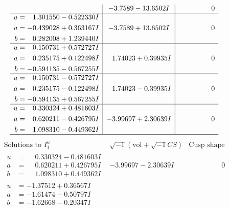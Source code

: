 \documentclass[1p]{elsarticle_modified}
\theoremstyle{definition}
\newcommand{\I}{\sqrt{-1}}
\begin{document}
$$\begin{array}{c|c|c}
 & -3.7589 - 13.6502 I & \phantom{-0.000000 } 0 \\ \hline\begin{aligned}
u &= \phantom{-}1.301550 - 0.522330 I \\
a &= -0.439028 + 0.363167 I \\
b &= \phantom{-}0.282008 + 1.239440 I\end{aligned}
 & -3.7589 + 13.6502 I & \phantom{-0.000000 } 0 \\ \hline\begin{aligned}
u &= \phantom{-}0.150731 + 0.572727 I \\
a &= \phantom{-}0.235175 + 0.122498 I \\
b &= -0.594135 - 0.567255 I\end{aligned}
 & \phantom{-}1.74023 + 0.39935 I & \phantom{-0.000000 } 0 \\ \hline\begin{aligned}
u &= \phantom{-}0.150731 - 0.572727 I \\
a &= \phantom{-}0.235175 - 0.122498 I \\
b &= -0.594135 + 0.567255 I\end{aligned}
 & \phantom{-}1.74023 - 0.39935 I & \phantom{-0.000000 } 0 \\ \hline\begin{aligned}
u &= \phantom{-}0.330324 + 0.481603 I \\
a &= \phantom{-}0.620211 - 0.426795 I \\
b &= \phantom{-}1.098310 - 0.449362 I\end{aligned}
 & -3.99697 + 2.30639 I & \phantom{-0.000000 } 0\\
 \hline 
 \end{array}$$\newpage$$\begin{array}{c|c|c}  
\text{Solutions to }I^u_{1}& \I (\text{vol} + \sqrt{-1}CS) & \text{Cusp shape}\\
 \hline 
\begin{aligned}
u &= \phantom{-}0.330324 - 0.481603 I \\
a &= \phantom{-}0.620211 + 0.426795 I \\
b &= \phantom{-}1.098310 + 0.449362 I\end{aligned}
 & -3.99697 - 2.30639 I & \phantom{-0.000000 } 0 \\ \hline\begin{aligned}
u &= -1.37512 + 0.36567 I \\
a &= -1.61474 - 0.50797 I \\
b &= -1.62668 - 0.20347 I\end{aligned}

\end{array}$$
\end{document}
